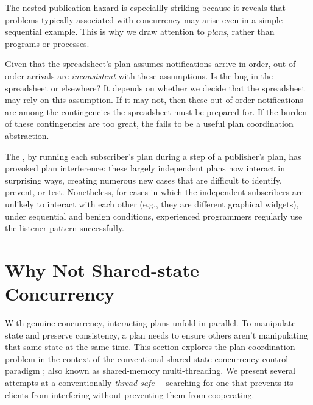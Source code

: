 \documentclass{llncs}
\begin{document}
%
The nested publication hazard is especiallly striking because it
reveals that problems typically associated with concurrency may arise
even in a simple sequential example. This is why we draw attention to
\emph{plans}, rather than programs or processes.

 Given that
the spreadsheet's plan assumes notifications arrive in order, out of
order arrivals are \emph{inconsistent} with these assumptions. Is the
bug in the spreadsheet or elsewhere?  It depends on whether we decide
that the spreadsheet may rely on this assumption. If it may not, then
these out of order notifications are among the contingencies the
spreadsheet must be prepared for. If the burden of these contingencies
are too great, the  fails to be a useful plan
coordination abstraction.

The , by running each subscriber's plan
during a step of a publisher's plan, has provoked plan interference:
these largely independent plans now interact in surprising ways,
creating numerous new cases that are difficult to identify, prevent,
or test. Nonetheless, for cases in which the independent subscribers
are unlikely to interact with each other (e.g., they are different
graphical widgets), under sequential and benign conditions,
experienced programmers regularly use the listener pattern
successfully.


\section{Why Not Shared-state Concurrency}

With genuine concurrency, interacting plans unfold in parallel. To
manipulate state and preserve consistency, a plan needs to ensure
others aren't manipulating that same state at the same time. This
section explores the plan coordination problem in the context of the
conventional shared-state concurrency-control paradigm
\cite{VanRoyHaridi}; also known as shared-memory multi-threading. We
present several attempts at a conventionally \emph{thread-safe}
---searching for one that prevents its clients from
interfering without preventing them from
cooperating. 
\end{document}
